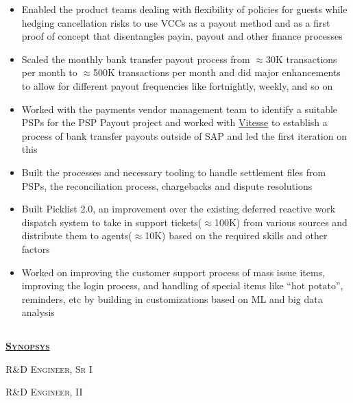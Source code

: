 \documentclass{article}
\begin{document}
\begin{itemize}[noitemsep,nolistsep]
\item Enabled the product teams dealing with flexibility of policies for guests while hedging cancellation risks to use VCCs as a payout method and as a first proof of concept that disentangles payin, payout and other finance processes
\item Scaled the monthly bank transfer payout process from $\approx$30K transactions per month to $\approx$500K transactions per month and did major enhancements to allow for different payout frequencies like fortnightly, weekly, and so on
\item Worked with the payments vendor management team to identify a suitable PSPs for the PSP Payout project and worked with \href{https://vitessepsp.com/}{Vitesse} to establish a process of bank transfer payouts outside of SAP and led the first iteration on this
\item Built the processes and necessary tooling to handle settlement files from PSPs, the reconciliation process, chargebacks and dispute resolutions
\item Built Picklist 2.0, an improvement over the existing deferred reactive work dispatch system to take in support tickets($\approx$100K) from various sources and distribute them to agents($\approx$10K) based on the required skills and other factors
\item Worked on improving the customer support process of mass issue items, improving the login process, and handling of special items like “hot potato”, reminders, etc by building in customizations based on ML and big data analysis
\end{itemize}

\subsection[Synopsys]{}

{\raggedright{\textsc{\textbf{\href{https://www.synopsys.com/}{Synopsys}}}}} \hfill {}

{\raggedright{\textsc{R\&D Engineer, Sr I}}} \hfill {}

{\raggedright{\textsc{R\&D Engineer, II}}} \hfill {}
\end{document}
